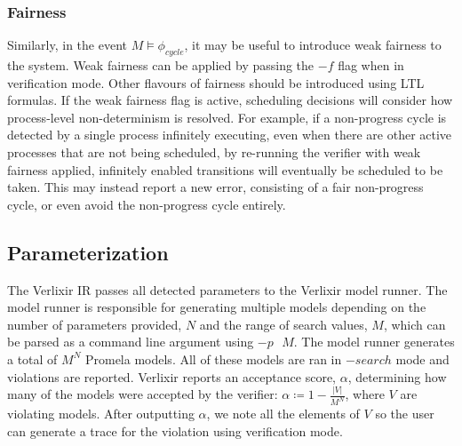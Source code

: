 \subsubsection{Fairness}
Similarly, in the event $M \models \phi _{cycle}$, it may be useful to introduce weak fairness to the system. Weak fairness can be applied by passing the $-f$ flag when in verification mode. Other flavours of fairness should be introduced using LTL formulas. If the weak fairness flag is active, scheduling decisions will consider how process-level non-determinism is resolved. For example, if a non-progress cycle is detected by a single process infinitely executing, even when there are other active processes that are not being scheduled, by re-running the verifier with weak fairness applied, infinitely enabled transitions will eventually be scheduled to be taken. This may instead report a new error, consisting of a fair non-progress cycle, or even avoid the non-progress cycle entirely.  
\subsection{Parameterization}
The Verlixir IR passes all detected parameters to the Verlixir model runner. The model runner is responsible for generating multiple models depending on the number of parameters provided, $N$ and the range of search values, $M$, which can be parsed as a command line argument using $-p\text{ }M$. The model runner generates a total of $M^N$ Promela models. All of these models are ran in $-search$ mode and violations are reported. Verlixir reports an acceptance score, $\alpha$, determining how many of the models were accepted by the verifier: $\alpha \coloneq 1 - \frac{|V|}{M^N}$, where $V$ are violating models. After outputting $\alpha$, we note all the elements of $V$ so the user can generate a trace for the violation using verification mode.

